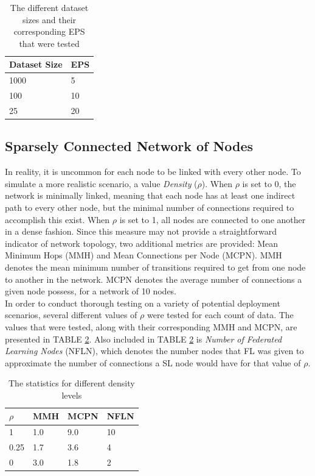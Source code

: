 \documentclass[letterpaper, 10 pt, conference]{ieeeconf}  %
\begin{document}
\begin{table}[H]
	\centering
	\begin{tabular}{l|l}
		Dataset Size & EPS \\ \hline 
		1000   & 5  \\
		100   & 10  \\
		25  & 20 
	\end{tabular}
	\caption{The different dataset sizes and their corresponding EPS that were tested} \label{epsparams}
\end{table}

\subsection{Sparsely Connected Network of Nodes}
In reality, it is uncommon for each node to be linked with every other node. To simulate a more realistic scenario, a value \emph{Density} ($\rho$). When $\rho$ is set to 0, the network is minimally linked, meaning that each node has at least one indirect path to every other node, but the minimal number of connections required to accomplish this exist. When $\rho$ is set to 1, all nodes are connected to one another in a dense fashion. Since this measure may not provide a straightforward indicator of network topology, two additional metrics are provided:  Mean Minimum Hops (MMH) and Mean Connections per Node (MCPN). MMH denotes the mean minimum number of transitions required to get from one node to another in the network. MCPN denotes the average number of connections a given node possess, for a network of 10 nodes. \\

In order to conduct thorough testing on a variety of potential deployment scenarios, several different values of $\rho$ were tested for each count of data. The values that were tested, along with their corresponding MMH and MCPN, are presented in TABLE \ref{sparsedensities}. Also included in TABLE \ref{sparsedensities} is \emph{Number of Federated Learning Nodes} (NFLN), which denotes the number nodes that FL was given to approximate the number of connections a SL node would have for that value of $\rho$.

\begin{table}[H]
	\centering
	\begin{tabular}{l|l|l|l}
		$\rho$ & MMH & MCPN & NFLN \\ \hline
		1 & 1.0 & 9.0 &  10\\
		0.25    & 1.7 & 3.6 & 4 \\
		0    & 3.0 & 1.8  & 2 \\
	\end{tabular}
	\caption{The statistics for different density levels} \label{sparsedensities}
\end{table}
\end{document}
